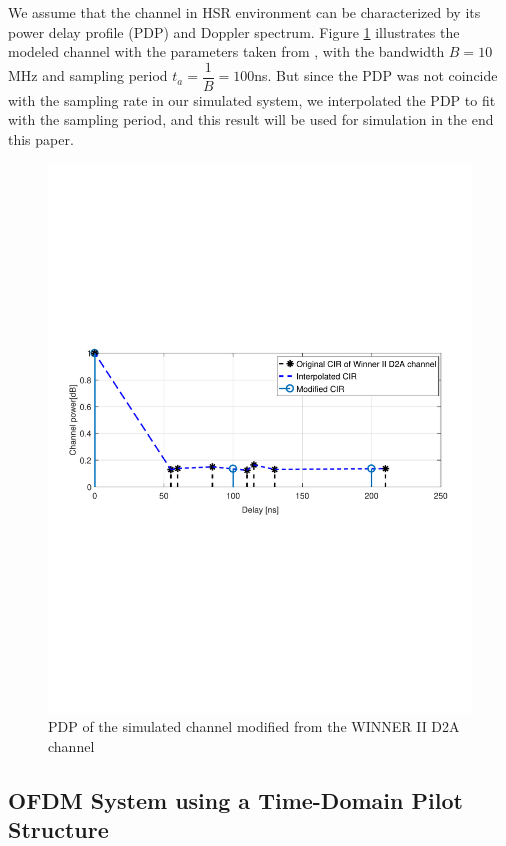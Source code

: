 \documentclass[12pt,journal,draftclsnofoot,onecolumn]{IEEEtran}
\begin{document}
We assume that the channel in HSR environment can be characterized by its power delay profile (PDP) and Doppler spectrum. Figure \ref{fig:rhod2achannel} illustrates the modeled channel  with the parameters taken from \cite{Guan2011}, with the bandwidth $B=10$MHz and sampling period $t_a=\dfrac{1}{B}=100$ns. But since the PDP was not coincide with the sampling rate in our simulated system, we interpolated the PDP to fit with the sampling period, and this result will be used for simulation in the end this paper.
%
\begin{figure}
		\centering
		\includegraphics[width=1.0\linewidth]{figures/ChannelPowerModified.pdf}
		\caption{PDP of the simulated channel modified from the WINNER II D2A channel}
		\label{fig:rhod2achannel}
\end{figure}
	
\subsection{OFDM System using a Time-Domain Pilot Structure}\label{section-2.2}
	
\end{document}
